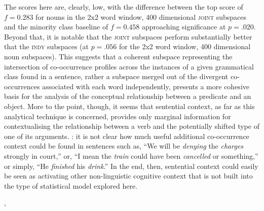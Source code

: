 The scores here are, clearly, low, with the difference between the top score of $f = 0.283$ for nouns in the 2x2 word window, 400 dimensional \textsc{joint} subspaces and the minority class baseline of $f = 0.458$ approaching significance at $p = .020$.  Beyond that, it is notable that the \textsc{joint} subspaces perform substantially better that the \textsc{indy} subspaces (at $p = .056$ for the 2x2 word window, 400 dimensional noun subspaces).  This suggests that a coherent subspace representing the intersection of co-occurrence profiles across the instances of a given grammatical class found in a sentence, rather a subspace merged out of the divergent co-occurrences associated with each word independently, presents a more cohesive basis for the analysis of the conceptual relationship between a predicate and an object.  More to the point, though, it seems that sentential context, as far as this analytical technique is concerned, provides only marginal information for contextualising the relationship between a verb and the potentially shifted type of one of its arguments.   : it is not clear how much useful additional co-occurrence context could be found in sentences such as, ``We will be \emph{denying} the \emph{charges} strongly in court,'' or, ``I mean the \emph{train} could have been \emph{cancelled} or something,'' or simply, ``He \emph{finished} his \emph{drink}.''  In the end, then, sentential context could easily be seen as activating other non-linguistic cognitive context that is not built into the type of statistical model explored here.

 \citep{BleiEA2003}, 

